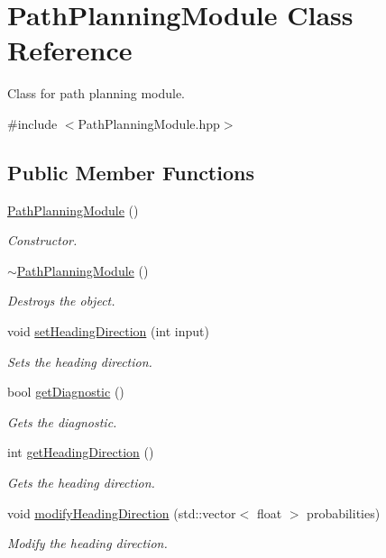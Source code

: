 \hypertarget{class_path_planning_module}{}\section{Path\+Planning\+Module Class Reference}
\label{class_path_planning_module}


Class for path planning module.  




{\ttfamily \#include $<$Path\+Planning\+Module.\+hpp$>$}

\subsection*{Public Member Functions}
\begin{DoxyCompactItemize}
\item 
\hyperlink{class_path_planning_module_a45510d19b199ab89cecc1bf6e8b252eb}{Path\+Planning\+Module} ()
\begin{DoxyCompactList}\small\item\em Constructor. \end{DoxyCompactList}\item 
\hyperlink{class_path_planning_module_acc73ccfa18e08a1771b72bb418d96258}{$\sim$\+Path\+Planning\+Module} ()\hypertarget{class_path_planning_module_acc73ccfa18e08a1771b72bb418d96258}{}\label{class_path_planning_module_acc73ccfa18e08a1771b72bb418d96258}

\begin{DoxyCompactList}\small\item\em Destroys the object. \end{DoxyCompactList}\item 
void \hyperlink{class_path_planning_module_ab44f3d8c24aa57a71ceac2eb71c09c2d}{set\+Heading\+Direction} (int input)
\begin{DoxyCompactList}\small\item\em Sets the heading direction. \end{DoxyCompactList}\item 
bool \hyperlink{class_path_planning_module_a19d31df2f1edafc25580c0c07151e014}{get\+Diagnostic} ()
\begin{DoxyCompactList}\small\item\em Gets the diagnostic. \end{DoxyCompactList}\item 
int \hyperlink{class_path_planning_module_a9aa558d9c088584cbaf37ecede8890b9}{get\+Heading\+Direction} ()
\begin{DoxyCompactList}\small\item\em Gets the heading direction. \end{DoxyCompactList}\item 
void \hyperlink{class_path_planning_module_ae760345016ddc0c7b9381f86240a6ddf}{modify\+Heading\+Direction} (std\+::vector$<$ float $>$ probabilities)
\begin{DoxyCompactList}\small\item\em Modify the heading direction. \end{DoxyCompactList}\end{DoxyCompactItemize}


